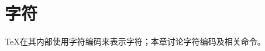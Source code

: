 \documentclass{book}
\begin{document}
\chapter{字符}\label{char}

\TeX 在其内部使用字符编码来表示字符；本章讨论字符编码及相关命令。

\label{cschap:char}\label{cschap:chardef}\label{cschap:accent}\label{cschap:uccode}\label{cschap:lccode}
\label{cschap:uppercase}\label{cschap:lowercase}\label{cschap:string}\label{cschap:escapechar}
\end{document}

